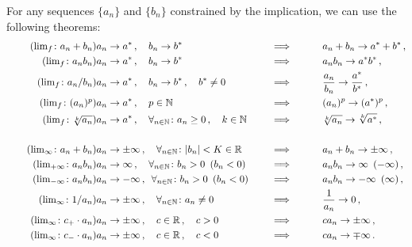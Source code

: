 \documentclass[week=3]{homework}
\begin{document}
\begin{questions}
	    For any sequences $\{a_n\}$ and $\{b_n\}$ constrained by the implication, we can use the following theorems:	    
	    \begin{alignat}{3}
		    \label{th:lim:a+b:finite} \tag{$\lim_f\colon a_n+b_n$}		a_n &\to a^* \,, \quad b_n \to b^* \qquad &&\implies \qquad &&a_n + b_n \to a^* + b^*\,, \\
	    	\label{th:lim:a*b:finite} \tag{$\lim_f\colon a_nb_n$}	a_n &\to a^* \,, \quad b_n \to b^* \qquad &&\implies \qquad &&a_nb_n \to a^*b^*\,, \\
	    	\label{th:lim:a/b:finite} \tag{$\lim_f\colon a_n/b_n$}		a_n &\to a^* \,, \quad b_n \to b^* \,, \quad b^* \neq 0 \qquad &&\implies \qquad &&\frac{a_n}{b_n} \to \frac{a^*}{b^*} \,, \\
	    	\label{th:lim:a^p:finite} \tag{$\lim_f\colon (a_n)^p$}		a_n &\to a^* \,, \quad p \in \naturals \qquad &&\implies \qquad &&(a_n)^p \to (a^*)^p \,, \\
	    	\label{th:lim:k root a:finite} \tag{$\lim_f\colon \sqrt[k]{a_n}$}	a_n &\to a^* \,, \quad \forall_{n\in\naturals}\colon a_n \geq 0\,, \quad k \in \naturals \quad &&\implies \qquad &&\sqrt[k]{a_n} \to \sqrt[k]{a^*} \,, \\
	    	\nonumber\\
	    	\label{th:lim:a+b:infinite} \tag{$\lim_\infty\colon a_n + b_n$}	a_n &\to \pm\infty \,, \quad \forall_{n\in\naturals}\colon |b_n| < K \in \reals \quad &&\implies \qquad &&a_n + b_n \to \pm\infty\,, \\
	    	\label{th:lim:a*b:infinite=} \tag{$\lim_{+\infty}\colon a_nb_n$}	a_n &\to \infty \,, \quad \forall_{n\in\naturals}\colon b_n > 0 \enskip (b_n < 0) \quad &&\implies \qquad &&a_nb_n \to \infty \enskip (-\infty)\,, \\
	    	\label{th:lim:a*b:infinite-} \tag{$\lim_{-\infty}\colon a_nb_n$}	a_n &\to -\infty \,, \enskip \forall_{n\in\naturals}\colon b_n > 0 \enskip (b_n < 0) \quad &&\implies \qquad &&a_nb_n \to -\infty \enskip (\infty)\,, \\
	    	\label{th:lim:1/a:infinite} \tag{$\lim_\infty\colon 1/a_n$}	a_n &\to \pm\infty \,, \quad \forall_{n\in\naturals}\colon a_n \neq 0 \quad &&\implies \qquad &&\frac{1}{a_n} \to 0\,, \\
	    	\label{th:lim:c+*a:infinite} \tag{$\lim_\infty\colon c_+ \cdot a_n$}	a_n &\to \pm\infty \,, \quad c \in \reals\,, \quad c > 0 \quad &&\implies \qquad &&ca_n \to \pm\infty\,, \\
	    	\label{th:lim:c-*a:infinite} \tag{$\lim_\infty\colon c_- \cdot a_n$}	a_n &\to \pm\infty \,, \quad c \in \reals\,, \quad c < 0 \quad &&\implies \qquad &&ca_n \to \mp\infty\,.
	    \end{alignat}
	    \begin{parts}

\end{parts}
\end{questions}
\end{document}
